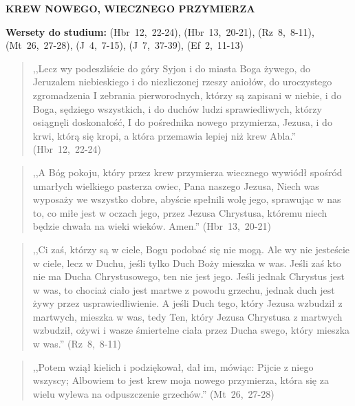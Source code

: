 \documentclass[10pt,a4paper,oneside]{article}
\begin{document}
\centerline{\textbf{\MakeUppercase{Krew nowego, wiecznego przymierza}}}
\begin{center}
\textbf{Wersety do studium:} \mbox{(Hbr 12, 22-24)}, \mbox{(Hbr 13, 20-21)}, \mbox{(Rz 8, 8-11)}, \mbox{(Mt 26, 27-28)}, \mbox{(J 4, 7-15)}, \mbox{(J 7, 37-39)}, \mbox{(Ef 2, 11-13)}
\end{center}
\begin{quote}
,,Lecz wy podeszliście do góry Syjon i do miasta Boga żywego, do Jeruzalem niebieskiego i do niezliczonej rzeszy aniołów, do uroczystego zgromadzenia I zebrania pierworodnych, którzy są zapisani w niebie, i do Boga, sędziego wszystkich, i do duchów ludzi sprawiedliwych, którzy osiągnęli doskonałość, I do pośrednika nowego przymierza, Jezusa, i do krwi, którą się kropi, a która przemawia lepiej niż krew Abla.'' \mbox{(Hbr 12, 22-24)}
\end{quote}
\begin{quote}
,,A Bóg pokoju, który przez krew przymierza wiecznego wywiódł spośród umarłych wielkiego pasterza owiec, Pana naszego Jezusa, Niech was wyposaży we wszystko dobre, abyście spełnili wolę jego, sprawując w nas to, co miłe jest w oczach jego, przez Jezusa Chrystusa, któremu niech będzie chwała na wieki wieków. Amen.'' \mbox{(Hbr 13, 20-21)}
\end{quote}
\begin{quote}
,,Ci zaś, którzy są w ciele, Bogu podobać się nie mogą. Ale wy nie jesteście w ciele, lecz w Duchu, jeśli tylko Duch Boży mieszka w was. Jeśli zaś kto nie ma Ducha Chrystusowego, ten nie jest jego. Jeśli jednak Chrystus jest w was, to chociaż ciało jest martwe z powodu grzechu, jednak duch jest żywy przez usprawiedliwienie. A jeśli Duch tego, który Jezusa wzbudził z martwych, mieszka w was, tedy Ten, który Jezusa Chrystusa z martwych wzbudził, ożywi i wasze śmiertelne ciała przez Ducha swego, który mieszka w was.'' \mbox{(Rz 8, 8-11)}
\end{quote}
\begin{quote}
,,Potem wziął kielich i podziękował, dał im, mówiąc: Pijcie z niego wszyscy; Albowiem to jest krew moja nowego przymierza, która się za wielu wylewa na odpuszczenie grzechów.'' \mbox{(Mt 26, 27-28)}
\end{quote}
\end{document}
